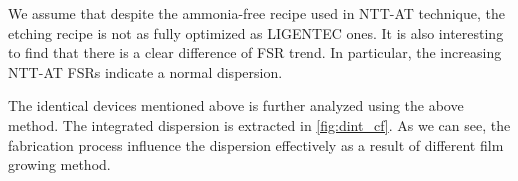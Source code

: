 We assume that despite the ammonia-free recipe used in NTT-AT technique, the etching recipe is not as fully optimized as LIGENTEC ones. It is also interesting to find that there is a clear difference of FSR trend. In particular, the increasing NTT-AT FSRs indicate a normal dispersion.


The identical devices mentioned above is further analyzed using the above method. The integrated dispersion is extracted in \autoref{fig:dint_cf}. 
As we can see, the fabrication process influence the dispersion effectively as a result of different film growing method.

\begin{figure}
	\centering
	
	\label{fig:dint_cf}
\end{figure}